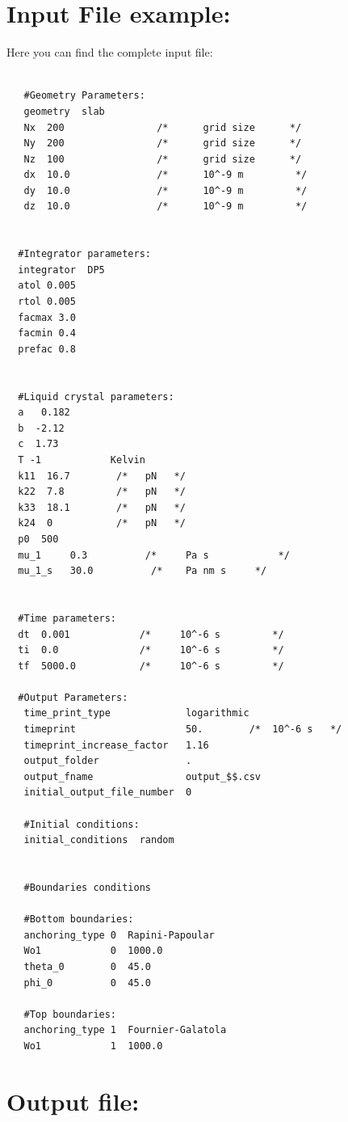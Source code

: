 \documentclass[final,5p,times,twocolumn]{elsarticle}
\begin{document}
 \section{Input File example:}
 \label{apx:input_file}

 Here you can find the complete input file:
\onecolumn
\begin{lstlisting}	

   #Geometry Parameters:
   geometry  slab
   Nx  200                /*      grid size      */
   Ny  200                /*      grid size      */
   Nz  100                /*      grid size      */
   dx  10.0               /*      10^-9 m         */
   dy  10.0               /*      10^-9 m         */
   dz  10.0               /*      10^-9 m         */


  #Integrator parameters:
  integrator  DP5
  atol 0.005
  rtol 0.005
  facmax 3.0
  facmin 0.4
  prefac 0.8


  #Liquid crystal parameters:
  a   0.182
  b  -2.12
  c  1.73
  T -1            Kelvin
  k11  16.7        /*   pN   */
  k22  7.8         /*   pN   */
  k33  18.1        /*   pN   */
  k24  0           /*   pN   */ 
  p0  500
  mu_1     0.3          /*     Pa s            */
  mu_1_s   30.0          /*    Pa nm s     */


  #Time parameters:
  dt  0.001            /*     10^-6 s         */	
  ti  0.0              /*     10^-6 s         */	
  tf  5000.0           /*     10^-6 s         */

  #Output Parameters:
   time_print_type             logarithmic
   timeprint                   50.        /*  10^-6 s   */
   timeprint_increase_factor   1.16            
   output_folder               .
   output_fname                output_$$.csv
   initial_output_file_number  0	

   #Initial conditions:
   initial_conditions  random


   #Boundaries conditions

   #Bottom boundaries:
   anchoring_type 0  Rapini-Papoular
   Wo1            0  1000.0
   theta_0        0  45.0
   phi_0          0  45.0	

   #Top boundaries:
   anchoring_type 1  Fournier-Galatola
   Wo1            1  1000.0

\end{lstlisting}
\twocolumn

\section{Output file:}\label{apx:output_file}
 
\end{document}
